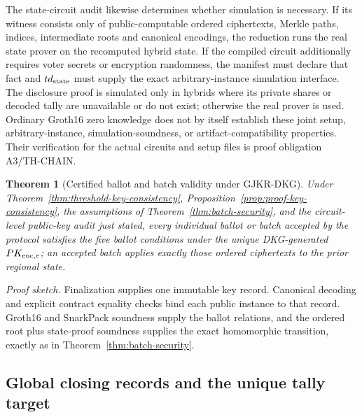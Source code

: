 \documentclass[pdflatex,sn-mathphys-num]{sn-jnl}%
\theoremstyle{thmstyleone}%
\newtheorem{theorem}{Theorem}%
\theoremstyle{thmstyletwo}%
\theoremstyle{thmstylethree}%
\begin{document}
The state-circuit audit likewise determines whether simulation is necessary.
If its witness consists only of public-computable ordered ciphertexts, Merkle
paths, indices, intermediate roots and canonical encodings, the reduction
runs the real state prover on the recomputed hybrid state.  If the compiled
circuit additionally requires voter secrets or encryption randomness, the
manifest must declare that fact and $td_{\rm state}$ must supply the exact
arbitrary-instance simulation interface.  The disclosure proof is simulated
only in hybrids where its private shares or decoded tally are unavailable or
do not exist; otherwise the real prover is used.  Ordinary Groth16 zero
knowledge does not by itself establish these joint setup, arbitrary-instance,
simulation-soundness, or artifact-compatibility properties.  Their verification
for the actual circuits and setup files is proof obligation A3/TH-CHAIN.

\begin{theorem}[Certified ballot and batch validity under GJKR-DKG]
\label{thm:threshold-certified-batch}
Under Theorem~\ref{thm:threshold-key-consistency},
Proposition~\ref{prop:proof-key-consistency}, the assumptions of
Theorem~\ref{thm:batch-security}, and the circuit-level public-key audit just
stated, every individual ballot or batch accepted by the protocol satisfies
the five ballot conditions under the unique DKG-generated
$PK_{{\rm enc},e}$; an accepted batch applies exactly those ordered
ciphertexts to the prior regional state.
\end{theorem}

\textit{Proof sketch.} Finalization supplies one immutable key record.
Canonical decoding and explicit contract equality checks bind each public
instance to that record.  Groth16 and SnarkPack soundness supply the ballot
relations, and the ordered root plus state-proof soundness supplies the exact
homomorphic transition, exactly as in Theorem~\ref{thm:batch-security}.

\subsection{Global closing records and the unique tally target}
\label{subsec:threshold-target}
\end{document}
